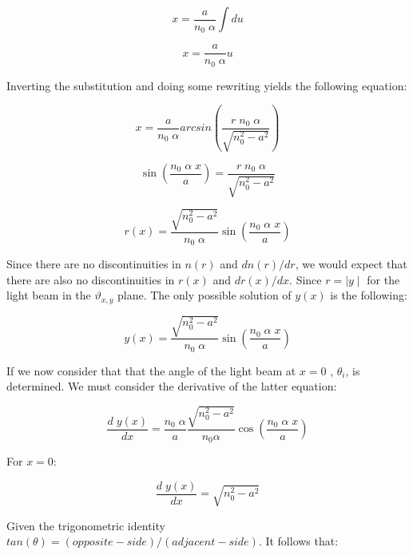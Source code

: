 \documentclass{article}
\begin{document}
\begin{equation*}
	x = \frac{a}{n_0 \; \alpha} \int du
\end{equation*}

\begin{equation*}
	x = \frac{a}{n_0 \; \alpha} u
\end{equation*}

Inverting the substitution and doing some rewriting yields the following equation:

\begin{equation*}
	x = \frac{a}{n_0 \; \alpha} arcsin \left( \frac{r \; n_0 \; \alpha}{\sqrt{n_0^2-a^2}} \right)
\end{equation*}

\begin{equation*}
	\sin \left( \frac{n_0 \; \alpha \; x}{a} \right) =  \frac{r \; n_0 \; \alpha}{\sqrt{n_0^2-a^2}}
\end{equation*}

\begin{equation*}
	r(x) = \frac{\sqrt{n_0^2-a^2}}{n_0 \; \alpha} \sin \left( \frac{n_0 \; \alpha \; x}{a} \right) 
\end{equation*}

Since there are no discontinuities in $n(r)$ and $dn(r)/dr$, we would expect that there are also no discontinuities in $r(x)$ and $dr(x)/dx$. Since $r = \mid y \mid$ for the light beam in the $\vartheta _{x,y}$ plane. The only possible solution of $y(x)$ is the following:

\begin{equation}
	y(x) = \frac{\sqrt{n_0^2-a^2}}{n_0 \;\alpha} \sin \left( \frac{n_0 \; \alpha \; x}{a}\right) 
	\label{eq_fibre_path}
\end{equation}

If we now consider that that the angle of the light beam at $x=0$ , $\theta _i$, is determined. We must consider the derivative of the latter equation:

\begin{equation*}
	\frac{d \; y(x)}{dx} =  \frac{n_0 \; \alpha}{a} \frac{\sqrt{n_0^2-a^2} }{n_0 \alpha} \cos \left( \frac{n_0 \; \alpha \; x}{a}\right) 
\end{equation*}

For $x=0$: 

\begin{equation*}
	\frac{d \; y(x)}{dx} =  \sqrt{n_0^2-a^2}
\end{equation*}

Given the trigonometric identity $tan (\theta) = (opposite-side)/(adjacent-side)$. It follows that:
\end{document}
